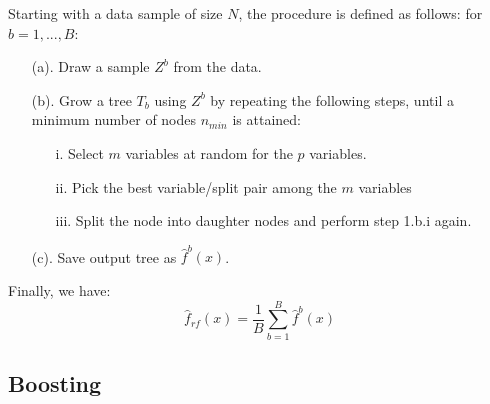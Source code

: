\documentclass[12pt]{report}
\begin{document}
Starting with a data sample of size $N$, the procedure is defined as follows: for $b = 1, ..., B$:\begin{itemize}
\item[(a).] Draw a sample $Z^b$ from the data.
\item[(b).] Grow a tree $T_b$ using $Z^b$ by repeating the following steps, until a minimum number of nodes $n_{min}$ is attained:\begin{itemize}
\item[i.] Select $m$ variables at random for the $p$ variables.
\item[ii.] Pick the best variable/split pair among the $m$ variables
\item[iii.] Split the node into daughter nodes and perform step 1.b.i again.
\end{itemize}
\item[(c).] Save output tree as $\hat f^b(x)$.
\end{itemize}
Finally, we have: $$\hat f_{rf}(x) = \frac{1}{B}\sum_{b=1}^{B} \hat f^b(x)$$

\subsection{Boosting}
\end{document}
